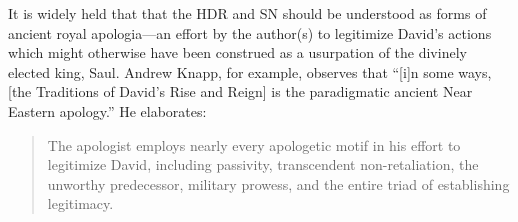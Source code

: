 It is widely held that that the HDR and SN should be understood as forms of ancient royal apologia---an effort by the author(s) to legitimize David's actions which might otherwise have been construed as a usurpation of the divinely elected king, Saul. Andrew Knapp, for example, observes that ``[i]n some ways, [the Traditions of David's Rise and Reign] is the paradigmatic ancient Near Eastern apology.''%
    \autocite[218]{knapp2015}
He elaborates:

\begin{quote}
    The apologist employs nearly every apologetic motif in his effort to legitimize David, including passivity, transcendent non-retaliation, the unworthy predecessor, military prowess, and the entire triad of establishing legitimacy.%
    \autocite{knapp2015}
\end{quote}

